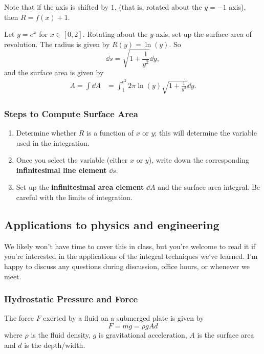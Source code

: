 Note that if the axis is shifted by $1$, (that is, rotated about the $y = -1$ axis), then $R = f(x) + 1$.

\begin{ex} Let $y = e^x$ for $x \in [0, 2]$. Rotating about the $y$-axis, set up the surface area of revolution.
    The radius is given by $R(y) = \ln(y)$. So 
    \[\dd s = \sqrt{1+\frac{1}{y^2}} \dd y,\] 
    and the surface area is given by
    \begin{align*}
        A = \int \dd A &= \int_1^{e^2} 2\pi \ln(y) \sqrt{1+\frac{1}{y^2}} \dd y.
    \end{align*}
\end{ex}
\subsubsection{Steps to Compute Surface Area}
\begin{enumerate}
    \item Determine whether $R$ is a function of $x$ or $y$; this will determine the variable used in the integration.
    \item Once you select the variable (either $x$ or $y$), write down the corresponding \textbf{infinitesimal line element} $\dd s$.
    \item Set up the \textbf{infinitesimal area element} $\dd A$ and the surface area integral. Be careful with the limits of integration.
\end{enumerate}

\subsection{Applications to physics and engineering} 

\begin{tcolorbox}
    We likely won’t have time to cover this in class, but you’re welcome to read it if you're interested in the applications of the integral techniques we've learned. I'm happy to discuss any questions during discussion, office hours, or whenever we meet.
\end{tcolorbox}


\subsubsection{Hydrostatic Pressure and Force}
The force $F$ exerted by a fluid on a submerged plate is given by
\begin{equation*}
F = m g = \rho g A d 
\end{equation*}
where $\rho$ is the fluid density, $g$ is gravitational acceleration, $A$ is the surface area and $d$ is the depth/width.

